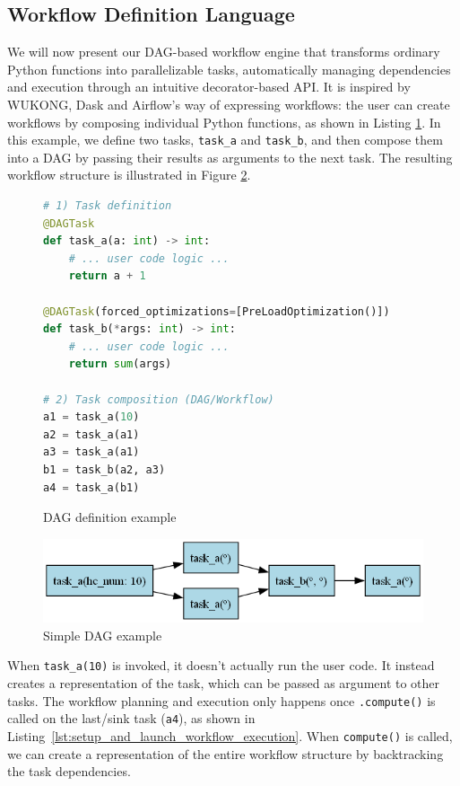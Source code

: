 \documentclass[conference]{IEEEtran}
\begin{document}
\subsection{Workflow Definition Language}
\label{ss:workflow_definition_language}

We will now present our DAG-based workflow engine that transforms ordinary Python functions into parallelizable tasks, automatically managing dependencies and execution through an intuitive decorator-based API. It is inspired by WUKONG, Dask and Airflow's way of expressing workflows: the user can create workflows by composing individual Python functions, as shown in Listing \ref{lst:dag_lang_example}. In this example, we define two tasks, \texttt{task\_a} and \texttt{task\_b}, and then compose them into a DAG by passing their results as arguments to the next task. The resulting workflow structure is illustrated in Figure \ref{fig:dag_lang_example}.

\begin{figure}[h]
\centering
\begin{lstlisting}[language=Python, basicstyle=\ttfamily\footnotesize, columns=fullflexible, breaklines=true]
# 1) Task definition
@DAGTask
def task_a(a: int) -> int:
    # ... user code logic ...
    return a + 1

@DAGTask(forced_optimizations=[PreLoadOptimization()])
def task_b(*args: int) -> int:
    # ... user code logic ...
    return sum(args)

# 2) Task composition (DAG/Workflow)
a1 = task_a(10)
a2 = task_a(a1)
a3 = task_a(a1)
b1 = task_b(a2, a3)
a4 = task_a(b1)
\end{lstlisting}
\caption{DAG definition example}
\label{lst:dag_lang_example}
\end{figure}

\begin{figure}[h]
    \centering
    \includegraphics[width=\columnwidth]{figures/dag_lang_example.png}
    \caption{Simple DAG example}
    \label{fig:dag_lang_example}
\end{figure}

When \texttt{task\_a(10)} is invoked, it doesn't actually run the user code. It instead creates a representation of the task, which can be passed as argument to other tasks. The workflow planning and execution only happens once \texttt{.compute()} is called on the last/sink task (\texttt{a4}), as shown in Listing~\ref{lst:setup_and_launch_workflow_execution}. When \texttt{compute()} is called, we can create a representation of the entire workflow structure by backtracking the task dependencies.
\end{document}
